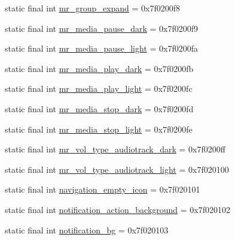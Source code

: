 \begin{CompactItemize}
\item 
static final int \hyperlink{classandroid_1_1support_1_1v7_1_1recyclerview_1_1_r_1_1drawable_ea13b449f263efd0f1a31f1f794fec1e}{mr\_\-group\_\-expand} = 0x7f0200f8
\item 
static final int \hyperlink{classandroid_1_1support_1_1v7_1_1recyclerview_1_1_r_1_1drawable_e451beacddad565780c398961fc6b272}{mr\_\-media\_\-pause\_\-dark} = 0x7f0200f9
\item 
static final int \hyperlink{classandroid_1_1support_1_1v7_1_1recyclerview_1_1_r_1_1drawable_c9abc473bcc0c93d9ea3a49e4e31e5b6}{mr\_\-media\_\-pause\_\-light} = 0x7f0200fa
\item 
static final int \hyperlink{classandroid_1_1support_1_1v7_1_1recyclerview_1_1_r_1_1drawable_1b8c7d5f92be0d88cb9dc98898980a17}{mr\_\-media\_\-play\_\-dark} = 0x7f0200fb
\item 
static final int \hyperlink{classandroid_1_1support_1_1v7_1_1recyclerview_1_1_r_1_1drawable_0886a3734d7bdaf23a37f588baddeaea}{mr\_\-media\_\-play\_\-light} = 0x7f0200fc
\item 
static final int \hyperlink{classandroid_1_1support_1_1v7_1_1recyclerview_1_1_r_1_1drawable_8963ac71dbdb6f2ca6e1fbc3a01fc3ca}{mr\_\-media\_\-stop\_\-dark} = 0x7f0200fd
\item 
static final int \hyperlink{classandroid_1_1support_1_1v7_1_1recyclerview_1_1_r_1_1drawable_9819e95344cb92c253af819a0fca202f}{mr\_\-media\_\-stop\_\-light} = 0x7f0200fe
\item 
static final int \hyperlink{classandroid_1_1support_1_1v7_1_1recyclerview_1_1_r_1_1drawable_eb48506c7e1703b146d08639acca6ea2}{mr\_\-vol\_\-type\_\-audiotrack\_\-dark} = 0x7f0200ff
\item 
static final int \hyperlink{classandroid_1_1support_1_1v7_1_1recyclerview_1_1_r_1_1drawable_abb7b242ef3e753323744415db1b8da4}{mr\_\-vol\_\-type\_\-audiotrack\_\-light} = 0x7f020100
\item 
static final int \hyperlink{classandroid_1_1support_1_1v7_1_1recyclerview_1_1_r_1_1drawable_6e074fdb35f1da1b230735f95cf08860}{navigation\_\-empty\_\-icon} = 0x7f020101
\item 
static final int \hyperlink{classandroid_1_1support_1_1v7_1_1recyclerview_1_1_r_1_1drawable_81ce83d103192dbdc3712ecd6b7cc43e}{notification\_\-action\_\-background} = 0x7f020102
\item 
static final int \hyperlink{classandroid_1_1support_1_1v7_1_1recyclerview_1_1_r_1_1drawable_d8e620b0a35b52dfedc97ba32555d981}{notification\_\-bg} = 0x7f020103

\end{CompactItemize}

